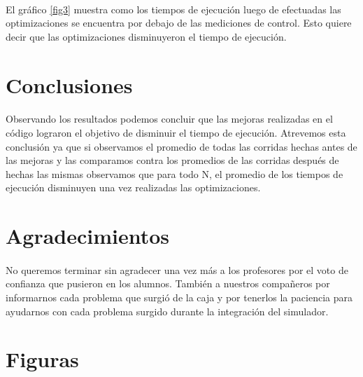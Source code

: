 \documentclass{article}
\begin{document}
\paragraph{}
El gráfico \ref {fig3} muestra como los tiempos de ejecución luego de efectuadas las optimizaciones se encuentra por debajo de las mediciones de control. Esto quiere decir que las optimizaciones disminuyeron el tiempo de ejecución.

\section{Conclusiones}

\paragraph{}
Observando los resultados podemos concluir que las mejoras realizadas en el código lograron el objetivo de disminuir el tiempo de ejecución. Atrevemos esta conclusión ya que si observamos el promedio de todas las corridas hechas antes de las mejoras y las comparamos contra los promedios de las corridas después de hechas las mismas observamos que para todo N, el promedio de los tiempos de ejecución disminuyen una vez realizadas las optimizaciones.

\section{Agradecimientos}

\paragraph{}
No queremos terminar sin agradecer una vez más a los profesores por el voto de confianza que pusieron en los alumnos. También a nuestros compañeros por informarnos cada problema que surgió de la caja y por tenerlos la paciencia para ayudarnos con cada problema surgido durante la integración del simulador.

\clearpage

\section{Figuras}
\end{document}
